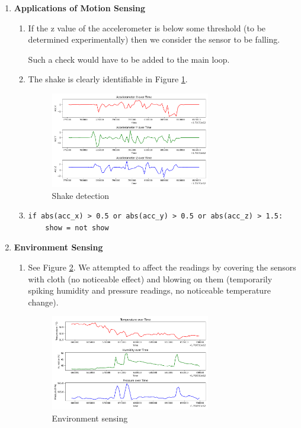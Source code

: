 \documentclass{article}
\begin{document}
\begin{enumerate}[label={\arabic*.}]
    \item \textbf{Applications of Motion Sensing}
    \begin{enumerate}
        \item If the z value of the accelerometer is below some threshold (to be determined experimentally) then we consider the sensor to be falling.
        
        Such a check would have to be added to the main loop.

        \item The shake is clearly identifiable in Figure \ref{fig:shake1}.
        \begin{figure}
            \centering
            \includegraphics[width=0.7\textwidth]{scripts/shake1.png}
            \caption{Shake detection}
            \label{fig:shake1}
        \end{figure}

        \item
        \begin{verbatim}
if abs(acc_x) > 0.5 or abs(acc_y) > 0.5 or abs(acc_z) > 1.5:
    show = not show
        \end{verbatim}
    \end{enumerate}

    \item \textbf{Environment Sensing}
    \begin{enumerate}
        \item See Figure \ref{fig:environment1}. We attempted to affect the readings by covering the sensors with cloth (no noticeable effect) and blowing on them (temporarily spiking humidity and pressure readings, no noticeable temperature change).
        \begin{figure}
            \centering
            \includegraphics[width=0.7\textwidth]{scripts/environment1.png}
            \caption{Environment sensing}
            \label{fig:environment1}
        \end{figure}


\end{enumerate}
\end{enumerate}
\end{document}
